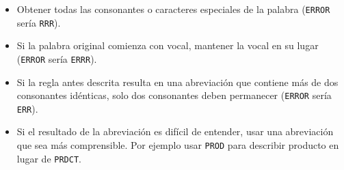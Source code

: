 \begin{itemize}
  \begin{itemize}

  \item Obtener todas las consonantes o caracteres especiales de la palabra
    (\texttt{ERROR} sería \texttt{RRR}).

  \item Si la palabra original comienza con vocal, mantener la vocal en su lugar
    (\texttt{ERROR} sería \texttt{ERRR}).

  \item Si la regla antes descrita resulta en una abreviación que contiene más
    de dos consonantes idénticas, solo dos consonantes deben permanecer
    (\texttt{ERROR} sería \texttt{ERR}).

  \item Si el resultado de la abreviación es difícil de entender, usar una
    abreviación que sea más comprensible. Por ejemplo usar \texttt{PROD} para
    describir producto en lugar de \texttt{PRDCT}.

  \end{itemize}

\end{itemize}

\cleardoublepage

